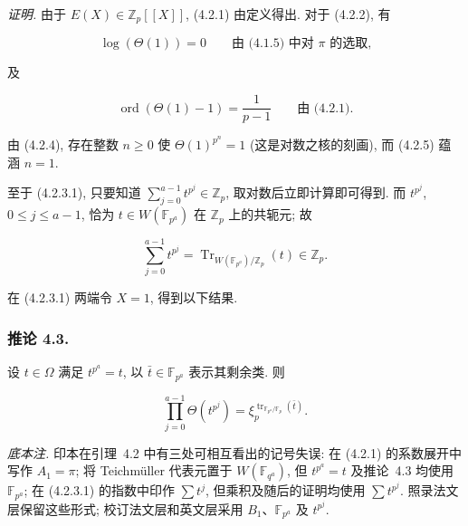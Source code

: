 \medskip
\noindent\emph{证明.}
由于 $E(X)\in\mathbb Z_p[[X]]$, (4.2.1) 由定义得出. 对于 (4.2.2), 有

\begin{equation}\tag{4.2.4}
\log(\Theta(1))=0
\qquad\text{由 (4.1.5) 中对 $\pi$ 的选取,}
\end{equation}

及

\begin{equation}\tag{4.2.5}
\operatorname{ord}(\Theta(1)-1)=\frac1{p-1}
\qquad\text{由 (4.2.1).}
\end{equation}

由 (4.2.4), 存在整数 $n\geq0$ 使 $\Theta(1)^{p^n}=1$
(这是对数之核的刻画), 而 (4.2.5) 蕴涵 $n=1$.

至于 (4.2.3.1), 只要知道 $\sum_{j=0}^{a-1}t^{p^j}\in\mathbb Z_p$,
取对数后立即计算即可得到. 而 $t^{p^j}$, $0\leq j\leq a-1$,
恰为 $t\in W(\mathbb F_{p^a})$ 在 $\mathbb Z_p$ 上的共轭元; 故

\[
\sum_{j=0}^{a-1}t^{p^j}
=\operatorname{Tr}_{W(\mathbb F_{p^a})/\mathbb Z_p}(t)\in\mathbb Z_p.
\]

在 (4.2.3.1) 两端令 $X=1$, 得到以下结果.

\subsubsection*{推论 4.3.}
设 $t\in\Omega$ 满足 $t^{p^a}=t$, 以 $\bar t\in\mathbb F_{p^a}$ 表示其剩余类. 则

\begin{equation}\tag{4.3.1}
\prod_{j=0}^{a-1}\Theta(t^{p^j})
=\xi_p^{\operatorname{tr}_{\mathbb F_{p^a}/\mathbb F_p}(\bar t)}.
\end{equation}

\medskip
\noindent\emph{底本注.}
印本在引理~4.2 中有三处可相互看出的记号失误:
在 (4.2.1) 的系数展开中写作 $A_1=\pi$;
将 Teichmüller 代表元置于 $W(\mathbb F_{q^a})$,
但 $t^{p^a}=t$ 及推论~4.3 均使用 $\mathbb F_{p^a}$;
在 (4.2.3.1) 的指数中印作 $\sum t^j$,
但乘积及随后的证明均使用 $\sum t^{p^j}$.
照录法文层保留这些形式; 校订法文层和英文层采用 $B_1$、$\mathbb F_{p^a}$ 及 $t^{p^j}$.
